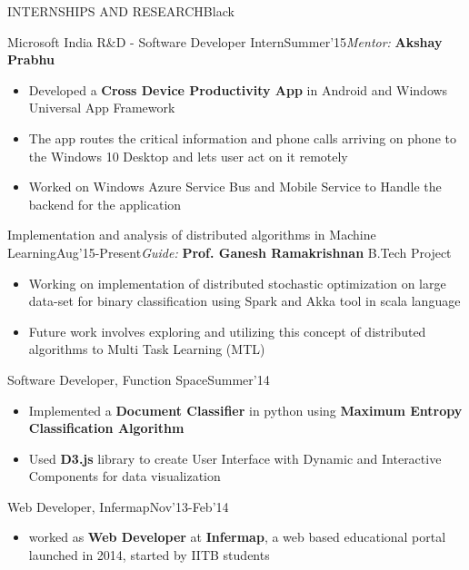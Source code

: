 \documentclass[11pt,a4paper]{article} %
\begin{document}
\begin{ressection}{INTERNSHIPS AND RESEARCH}{Black}

\begin{ressubsection}{Microsoft India R\&D - Software Developer Intern}{Summer'15}{\textit{Mentor:} \textbf{Akshay Prabhu}}
\begin{itemize}
\itemsep-0.3em
\item Developed a \textbf{Cross Device Productivity App} in Android and Windows Universal App Framework
\item The app routes the critical information and phone calls arriving on phone to the Windows 10 Desktop and lets user act on it remotely
\item Worked on Windows Azure Service Bus and Mobile Service to Handle the backend for the application
\end{itemize}
\end{ressubsection}


\begin{ressubsection}{Implementation and analysis of distributed algorithms in Machine Learning}{Aug'15-Present}{\textit{Guide:} \textbf{Prof. Ganesh Ramakrishnan} \hfill B.Tech Project}
\begin{itemize}
\itemsep-0.3em
\item Working on implementation of distributed stochastic optimization on large data-set for binary classification using Spark and Akka tool in scala language
\item Future work involves exploring and utilizing this concept of distributed algorithms to Multi Task Learning (MTL)
\end{itemize}
\end{ressubsection}

\begin{ressubsection}{Software Developer, Function Space}{Summer'14}{}
\begin{itemize}
\itemsep-0.3em
\item Implemented a \textbf{Document Classifier} in python using \textbf{Maximum Entropy Classification Algorithm}
\item Used \textbf{D3.js} library to create User Interface with Dynamic and Interactive Components for data visualization
\end{itemize}
\end{ressubsection}

\begin{ressubsection}{Web Developer, Infermap}{Nov'13-Feb'14}{}
\begin{itemize}
\itemsep-0.3em
\item worked as \textbf{Web Developer} at \textbf{Infermap}, a web based educational portal launched in 2014, started by IITB students
\end{itemize}
\end{ressubsection}
  
\end{ressection}
\end{document}
